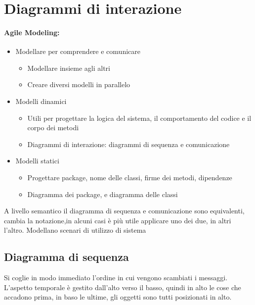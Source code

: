 \documentclass[12pt, a4paper, openany, twoside]{book}
\begin{document}
\section{Diagrammi di interazione}
\paragraph{Agile Modeling:}
\begin{itemize}
	\item Modellare per comprendere e comunicare
	\begin{itemize}
		\item Modellare insieme agli altri
		\item Creare diversi modelli in parallelo
	\end{itemize}
	\item Modelli dinamici
	\begin{itemize}
		\item Utili per progettare la logica del sistema, il comportamento del codice
		e il corpo dei metodi
		\item Diagrammi di interazione: diagrammi di sequenza e comunicazione 
	\end{itemize}
	\item Modelli statici
	\begin{itemize}
		\item Progettare package, nome delle classi, firme dei metodi, dipendenze
		\item Diagramma dei package, e diagramma delle classi
	\end{itemize}
\end{itemize}
A livello semantico il diagramma di sequenza e comunicazione sono equivalenti,
cambia la notazione,in alcuni casi è più utile applicare uno dei due, in altri
l'altro. Modellano scenari di utilizzo di sistema
\subsection{Diagramma di sequenza}
Si coglie in modo immediato l'ordine in cui vengono scambiati i messaggi. 
L'aspetto temporale è gestito dall'alto verso il basso, quindi in alto le cose
che accadono prima, in baso le ultime, gli oggetti sono tutti posizionati in alto.
\end{document}
